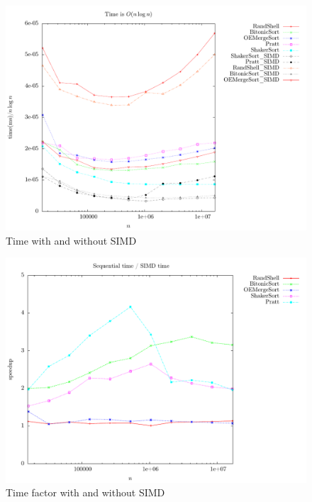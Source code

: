 \begin{figure}
\center
\includegraphics[width=\textwidth]{graphs/SIMD/nlogntime.pdf}
\caption{Time with and without SIMD}
\label{fig:SIMD:time}
\end{figure}


\begin{figure}
\center
\includegraphics[width=\textwidth]{graphs/SIMD/timediff.pdf}
\caption{Time factor with and without SIMD}
\label{fig:SIMD:timediff}
\end{figure}

